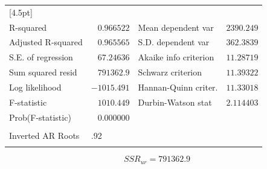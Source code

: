 \documentclass[12pt]{report}
\begin{document}
\begin{table}[!htbp]
\begin{tabular}{lrrrr}
		[4.5pt] \hline \\ [-4.5pt]
		\multicolumn{1}{l}{R-squared}&\multicolumn{1}{r}{$0.966522$}&\multicolumn{2}{l}{Mean dependent var}&\multicolumn{1}{r}{$2390.249$}\\
		\multicolumn{1}{l}{Adjusted R-squared}&\multicolumn{1}{r}{$0.965565$}&\multicolumn{2}{l}{S.D. dependent var}&\multicolumn{1}{r}{$362.3839$}\\
		\multicolumn{1}{l}{S.E. of regression}&\multicolumn{1}{r}{$67.24636$}&\multicolumn{2}{l}{Akaike info criterion}&\multicolumn{1}{r}{$11.28719$}\\
		\multicolumn{1}{l}{Sum squared resid}&\multicolumn{1}{r}{$791362.9$}&\multicolumn{2}{l}{Schwarz criterion}&\multicolumn{1}{r}{$11.39322$}\\
		\multicolumn{1}{l}{Log likelihood}&\multicolumn{1}{r}{$-1015.491$}&\multicolumn{2}{l}{Hannan-Quinn criter.}&\multicolumn{1}{r}{$11.33018$}\\
		\multicolumn{1}{l}{F-statistic}&\multicolumn{1}{r}{$1010.449$}&\multicolumn{2}{l}{Durbin-Watson stat}&\multicolumn{1}{r}{$2.114403$}\\
		\multicolumn{1}{l}{Prob(F-statistic)}&\multicolumn{1}{r}{$0.000000$}&\multicolumn{1}{c}{}&\multicolumn{1}{c}{}&\multicolumn{1}{c}{}\\
		[4.5pt] \hline \\ [-4.5pt]
		\multicolumn{1}{l}{Inverted AR Roots}&\multicolumn{1}{l}{.92}&\multicolumn{1}{c}{}&\multicolumn{1}{c}{}&\multicolumn{1}{c}{}\\
		[4.5pt] \hline \\ [-4.5pt]
	\end{tabular}
\end{table}


\vspace{-\baselineskip}
$$SSR_{ur} = 791362.9$$
\end{document}
